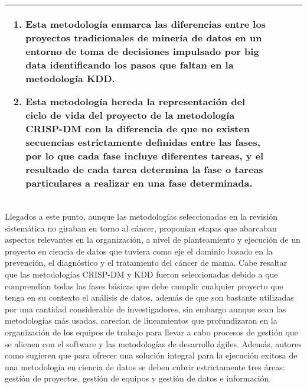 \begin{table*}[!htb]
\begin{threeparttable}
\begin{tabular}{p{1cm} p{2cm} p{5cm} p{6.5cm}}
\begin{enumerate}
				\item Esta metodología enmarca las diferencias entre los proyectos tradicionales de minería de datos en un entorno de toma de decisiones impulsado por big data identificando los pasos que faltan en la metodología KDD.
				\item Esta metodología hereda la representación del ciclo de vida del proyecto de la metodología CRISP-DM con la diferencia de que no existen  secuencias estrictamente definidas entre las fases, por lo que cada fase incluye diferentes tareas, y el resultado de cada tarea determina la fase o tareas particulares a realizar en una fase determinada. 
			\end{enumerate}
			\\ \hline
		\end{tabular}
	\end{threeparttable}
\end{table*}

\clearpage
Llegados a este punto, aunque las metodologías seleccionadas en la revisión sistemática no giraban en torno al cáncer, proponían etapas que abarcaban aspectos relevantes en la organización, a nivel de planteamiento y ejecución de un proyecto en ciencia de datos que tuviera como eje el dominio basado en la prevención, el diagnóstico y el tratamiento del cáncer de mama. Cabe resaltar que las metodologías CRISP-DM y KDD fueron seleccionadas debido a que comprendían todas las fases básicas que debe cumplir cualquier proyecto que tenga en su contexto el análisis de datos, además de que son bastante utilizadas por una cantidad considerable de investigadores, sin embargo aunque sean las metodologías más usadas, carecían de lineamientos que profundizaran en la organización de los equipos de trabajo para llevar a cabo procesos de gestión que se alienen con el software y las metodologías de desarrollo ágiles. Además, autores como \cite{Martinez2021} sugieren que para ofrecer una solución integral para la ejecución exitosa de una metodología en ciencia de datos se deben cubrir estrictamente tres áreas: gestión de proyectos, gestión de equipos y gestión de datos e información. 

